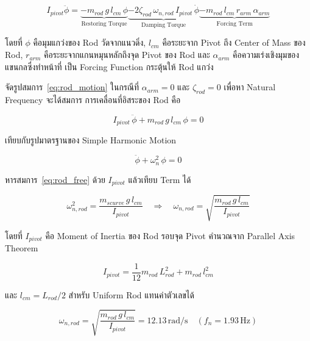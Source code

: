 \begin{equation}
  I_{pivot}\ddot{\phi} =
  \underbrace{-m_{rod}\,g\,l_{cm}\,\phi}_{\text{Restoring Torque}}
  \underbrace{-2\zeta_{rod}\,\omega_{n,rod}\,I_{pivot}\,\dot{\phi}}_{\text{Damping Torque}}
  \underbrace{-m_{rod}\,l_{cm}\,r_{arm}\,\alpha_{arm}}_{\text{Forcing Term}}
  \label{eq:rod_motion}
\end{equation}

โดยที่ $\phi$ คือมุมแกว่งของ Rod วัดจากแนวดิ่ง,
$l_{cm}$ คือระยะจาก Pivot ถึง Center of Mass ของ Rod,
$r_{arm}$ คือระยะจากแกนหมุนหลักถึงจุด Pivot ของ Rod
และ $\alpha_{arm}$ คือความเร่งเชิงมุมของแขนกลซึ่งทำหน้าที่
เป็น Forcing Function กระตุ้นให้ Rod แกว่ง

จัดรูปสมการ~\eqref{eq:rod_motion} ในกรณีที่ $\alpha_{arm} = 0$
และ $\zeta_{rod} = 0$ เพื่อหา Natural Frequency จะได้สมการ
การเคลื่อนที่อิสระของ Rod คือ

\begin{equation}
  I_{pivot}\,\ddot{\phi} + m_{rod}\,g\,l_{cm}\,\phi = 0
  \label{eq:rod_free}
\end{equation}

เทียบกับรูปมาตรฐานของ Simple Harmonic Motion

\begin{equation}
  \ddot{\phi} + \omega_{n}^{2}\,\phi = 0
  \label{eq:shm}
\end{equation}

หารสมการ~\eqref{eq:rod_free} ด้วย $I_{pivot}$ แล้วเทียบ Term ได้

\begin{equation}
  \omega_{n,rod}^{2} = \frac{m_{scurve}\,g\,l_{cm}}{I_{pivot}}
  \quad \Rightarrow \quad
  \omega_{n,rod} = \sqrt{\frac{m_{rod}\,g\,l_{cm}}{I_{pivot}}}
  \label{eq:wn_derive}
\end{equation}

โดยที่ $I_{pivot}$ คือ Moment of Inertia ของ Rod รอบจุด Pivot
คำนวณจาก Parallel Axis Theorem

\begin{equation}
  I_{pivot} = \frac{1}{12}m_{rod}\,L_{rod}^{2} + m_{rod}\,l_{cm}^{2}
  \label{eq:ipivot}
\end{equation}

และ $l_{cm} = L_{rod}/2$ สำหรับ Uniform Rod แทนค่าตัวเลขได้

\begin{equation}
  \omega_{n,rod} = \sqrt{\frac{m_{rod}\,g\,l_{cm}}{I_{pivot}}}
                = 12.13\,\text{rad/s}
                \quad (f_n = 1.93\,\text{Hz})
  \label{eq:wn_rod}
\end{equation}

